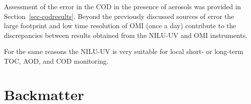 \documentclass{optica-article}
\begin{document}

Assessment of the error in the COD in the presence of aerosols was provided in Section~\ref{sec-codresults}.
Beyond the previously discussed sources of error the large footprint and low time resolution of OMI (once a day) contribute to the discrepancies between results obtained from the NILU-UV and OMI instruments.
 
For the same reasons the NILU-UV is very suitable for local short- or long-term TOC, AOD, and COD monitoring. 




\section{Backmatter}
\end{document}
